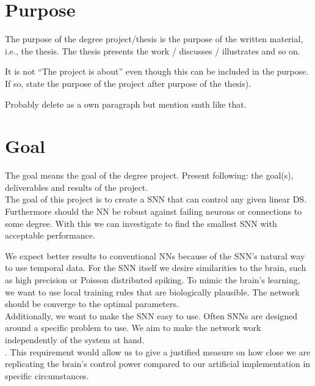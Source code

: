 \section{Purpose}
The purpose of the degree project/thesis is the purpose of the written material, i.e., the thesis. The thesis presents the work / discusses / illustrates and so on.

It is not “The project is about” even though this can be included in the purpose. If so, state the purpose of the project after purpose of the thesis).

Probably delete as a own paragraph but mention smth like that.

\section{Goal}
The goal means the goal of the degree project. Present following: the goal(s), deliverables and results of the project.\\

The goal of this project is to create a \ac{SNN} that can control  any given linear \ac{DS}. Furthermore should the \ac{NN} be robust against failing neurons or connections to some degree. With this we can investigate to find the smallest \ac{SNN} with acceptable performance.

We expect better results to conventional \acp{NN} because of the \ac{SNN}'s natural way to use temporal data. For the \ac{SNN} itself we desire similarities to the brain, such as high precision or Poisson distributed spiking.
To mimic the brain's learning, we want to use local training rules that are biologically plausible. The network should be converge to the optimal parameters.\\
Additionally, we want to make the \ac{SNN} easy to use. Often \acp{SNN} are designed around a specific problem to use. We aim to make the network work independently of the system at hand.\\

. This requirement would allow us to give a justified measure on how close we are replicating the brain's control power compared to our artificial implementation in specific circumstances.

